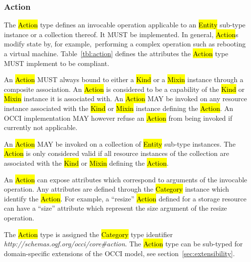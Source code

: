 \documentclass[10pt,a4paper]{article}
\begin{document}
\subsubsection{Action}
The \hl{Action} type defines an invocable operation applicable to an \hl{Entity}
sub-type instance or a collection thereof. It MUST be implemented. In general,
\hl{Action}s modify state by, for example,~performing a complex operation such as
rebooting a virtual machine.
%
Table~\ref{tbl:action} defines the attributes the \hl{Action} type MUST
implement to be compliant.


An \hl{Action} MUST always bound to either a \hl{Kind} or a \hl{Mixin} instance
through a composite association. An \hl{Action} is considered to be a
capability of the \hl{Kind} or \hl{Mixin} instance it is associated with.  An
\hl{Action} MAY be invoked on any resource instance associated with the
\hl{Kind} or \hl{Mixin} instance defining the \hl{Action}. An OCCI
implementation MAY however refuse an \hl{Action} from being invoked if
currently not applicable.

An \hl{Action} MAY be invoked on a collection of \hl{Entity} sub-type
instances. The \hl{Action} is only considered valid if all resource instances
of the collection are associated with the \hl{Kind} or \hl{Mixin} defining the
\hl{Action}.

An \hl{Action} can expose attributes which correspond to arguments of the
invocable operation.  Any attributes are defined through the \hl{Category}
instance which identify the \hl{Action}. For example, a ``resize'' \hl{Action}
defined for a storage resource can have a ``size'' attribute which represent the
size argument of the resize operation.

The \hl{Action} type is assigned the \hl{Category} type identifier
\textit{http://schemas.ogf.org/occi/core\#action}.
%
The \hl{Action} type can be sub-typed for domain-specific extensions of the
OCCI model, see section~\ref{sec:extensibility}.
\end{document}

